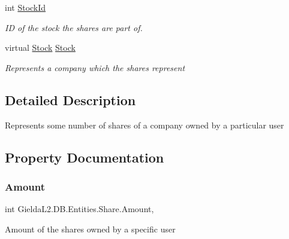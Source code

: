 \begin{DoxyCompactItemize}
int \mbox{\hyperlink{class_gielda_l2_1_1_d_b_1_1_entities_1_1_share_af47897e74933c9bf8bb31dbae924cf8b}{Stock\+Id}}
\begin{DoxyCompactList}\small\item\em ID of the stock the shares are part of. \end{DoxyCompactList}\item 
virtual \mbox{\hyperlink{class_gielda_l2_1_1_d_b_1_1_entities_1_1_stock}{Stock}} \mbox{\hyperlink{class_gielda_l2_1_1_d_b_1_1_entities_1_1_share_a9cf67a983e7ae7ba34ef200c971afe61}{Stock}}
\begin{DoxyCompactList}\small\item\em Represents a company which the shares represent \end{DoxyCompactList}\end{DoxyCompactItemize}


\subsection{Detailed Description}
Represents some number of shares of a company owned by a particular user 



\subsection{Property Documentation}
\mbox{\label{class_gielda_l2_1_1_d_b_1_1_entities_1_1_share_a7090c17c53c51b579b138b3b08d3bf67}} 
\subsubsection{\texorpdfstring{Amount}{Amount}}
{\footnotesize\ttfamily int Gielda\+L2.\+D\+B.\+Entities.\+Share.\+Amount\hspace{0.3cm}{\ttfamily [get]}, {\ttfamily [set]}}



Amount of the shares owned by a specific user 

\mbox{\label{class_gielda_l2_1_1_d_b_1_1_entities_1_1_share_ae2ad308ad36837a00e09d1bf49e6890b}} 
